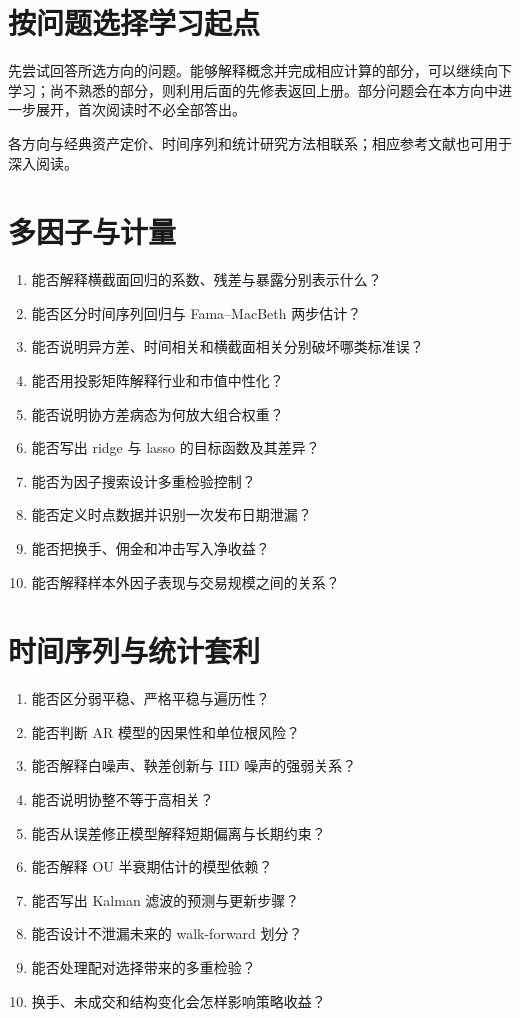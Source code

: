 \section{按问题选择学习起点}

先尝试回答所选方向的问题。能够解释概念并完成相应计算的部分，可以继续向下学习；尚不熟悉的部分，则利用后面的先修表返回上册。部分问题会在本方向中进一步展开，首次阅读时不必全部答出。

\newcommand{\RouteScoreInterpretation}{}

各方向与经典资产定价、时间序列和统计研究方法相联系；相应参考文献也可用于深入阅读\cite{fama1973risk,brockwell2016timeseries,white2000reality,bailey2017backtest}。

\section{多因子与计量}\label{route:multifactor}

\begin{enumerate}
  \item 能否解释横截面回归的系数、残差与暴露分别表示什么？
  \item 能否区分时间序列回归与 Fama--MacBeth 两步估计？
  \item 能否说明异方差、时间相关和横截面相关分别破坏哪类标准误？
  \item 能否用投影矩阵解释行业和市值中性化？
  \item 能否说明协方差病态为何放大组合权重？
  \item 能否写出 ridge 与 lasso 的目标函数及其差异？
  \item 能否为因子搜索设计多重检验控制？
  \item 能否定义时点数据并识别一次发布日期泄漏？
  \item 能否把换手、佣金和冲击写入净收益？
  \item 能否解释样本外因子表现与交易规模之间的关系？
\end{enumerate}
\RouteScoreInterpretation

\section{时间序列与统计套利}\label{route:stat-arb}

\begin{enumerate}
  \item 能否区分弱平稳、严格平稳与遍历性？
  \item 能否判断 AR 模型的因果性和单位根风险？
  \item 能否解释白噪声、鞅差创新与 IID 噪声的强弱关系？
  \item 能否说明协整不等于高相关？
  \item 能否从误差修正模型解释短期偏离与长期约束？
  \item 能否解释 OU 半衰期估计的模型依赖？
  \item 能否写出 Kalman 滤波的预测与更新步骤？
  \item 能否设计不泄漏未来的 walk-forward 划分？
  \item 能否处理配对选择带来的多重检验？
  \item 换手、未成交和结构变化会怎样影响策略收益？
\end{enumerate}
\RouteScoreInterpretation

